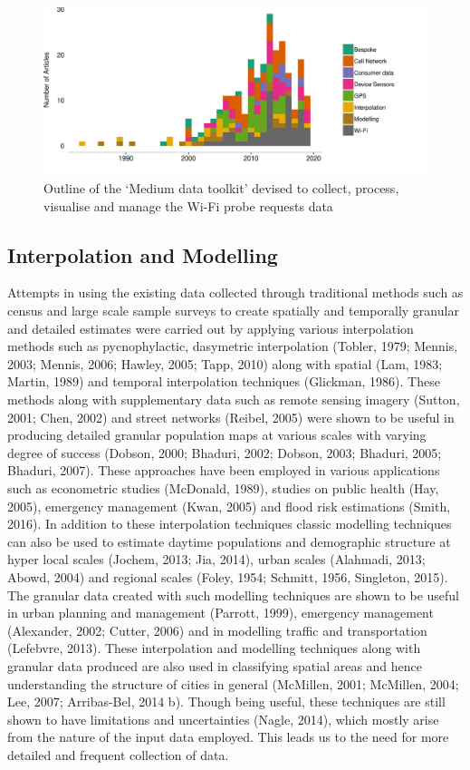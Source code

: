 \begin{figure}
  \includegraphics{images/literature-tech-timeline.png}
  \caption{Outline of the `Medium data toolkit' devised to collect, process, visualise and manage the Wi-Fi probe requests data}
  \label{figure:literature:tech:timeline}
\end{figure}

\subsection{Interpolation and Modelling}
Attempts in using the existing data collected through traditional methods such as census and large scale sample surveys to create spatially and temporally granular and detailed estimates were carried out by applying various interpolation methods such as pycnophylactic, dasymetric interpolation (Tobler, 1979; Mennis, 2003; Mennis, 2006; Hawley, 2005; Tapp, 2010) along with spatial (Lam, 1983; Martin, 1989) and temporal interpolation techniques (Glickman, 1986).
These methods along with supplementary data such as remote sensing imagery (Sutton, 2001; Chen, 2002) and street networks (Reibel, 2005) were shown to be useful in producing detailed granular population maps at various scales with varying degree of success (Dobson, 2000; Bhaduri, 2002; Dobson, 2003; Bhaduri, 2005; Bhaduri, 2007).
These approaches have been employed in various applications such as econometric studies (McDonald, 1989), studies on public health (Hay, 2005), emergency management (Kwan, 2005) and flood risk estimations (Smith, 2016).
In addition to these interpolation techniques classic modelling techniques can also be used to estimate daytime populations and demographic structure at hyper local scales (Jochem, 2013; Jia, 2014), urban scales (Alahmadi, 2013; Abowd, 2004) and regional scales (Foley, 1954; Schmitt, 1956, Singleton, 2015).
The granular data created with such modelling techniques are shown to be useful in urban planning and management (Parrott, 1999), emergency management (Alexander, 2002; Cutter, 2006) and in modelling traffic and transportation (Lefebvre, 2013).
These interpolation and modelling techniques along with granular data produced are also used in classifying spatial areas and hence understanding the structure of cities in general (McMillen, 2001; McMillen, 2004; Lee, 2007; Arribas-Bel, 2014 b).
Though being useful, these techniques are still shown to have limitations and uncertainties (Nagle, 2014), which mostly arise from the nature of the input data employed.
This leads us to the need for more detailed and frequent collection of data.

